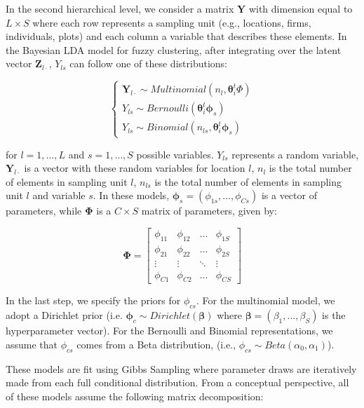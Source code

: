 \documentclass[article]{jss}
\begin{document}
In the second hierarchical level, we consider a matrix \(\mathbf{Y}\)
with dimension equal to \(L\times S\) where each row represents a
sampling unit (e.g., locations, firms, individuals, plots) and each
column a variable that describes these elements. In the Bayesian LDA
model for fuzzy clustering, after integrating over the latent vector
\(\mathbf{Z}_{l\cdot}\), \(Y_{ls}\) can follow one of these
distributions:

\begin{equation}
\begin{cases}
\mathbf{Y}_{l\cdot}\sim Multinomial(n_{l},\boldsymbol\theta_{i}^{t}\Phi)\\
Y_{ls}\sim Bernoulli(\boldsymbol\theta_{i}^{t}\boldsymbol\phi_{s})\\
Y_{ls}\sim Binomial(n_{ls},\boldsymbol\theta_{i}^{t}\boldsymbol\phi_{s})
        \label{eq:eq0003}
\end{cases}     
\end{equation}

\noindent for \(l=1,\dots,L\) and \(s=1,\dots,S\) possible variables.
\(Y_{ls}\) represents a random variable, \(\boldsymbol Y_{l\cdot}\) is a
vector with these random variables for location \(l\), \(n_{l}\) is the
total number of elements in sampling unit \(l\), \(n_{ls}\) is the total
number of elements in sampling unit \(l\) and variable \(s\). In these
models, \(\boldsymbol\phi_{s}=(\phi_{1s},\dots,\phi_{Cs})\) is a vector
of parameters, while \(\boldsymbol\Phi\) is a \(C\times S\) matrix of
parameters, given by:

\[
\mathbf{\Phi}=\begin{bmatrix}
    \phi_{11} & \phi_{12} & \dots  & \phi_{1S} \\
    \phi_{21} & \phi_{22} & \dots  & \phi_{2S} \\
    \vdots & \vdots  & \ddots & \vdots \\
    \phi_{C1} & \phi_{C2} & \dots  & \phi_{CS} 
\end{bmatrix}
\]

In the last step, we specify the priors for \(\phi_{cs}\). For the
multinomial model, we adopt a Dirichlet prior (i.e.
\(\boldsymbol\phi_{c}\sim Dirichlet(\boldsymbol\beta)\) where
\(\boldsymbol\beta=(\beta_{1},\dots,\beta_{S})\) is the hyperparameter
vector). For the Bernoulli and Binomial representations, we assume that
\(\phi_{cs}\) comes from a Beta distribution, (i.e.,
\(\phi_{cs}\sim Beta(\alpha_{0},\alpha_{1})\)).

These models are fit using Gibbs Sampling where parameter draws are
iteratively made from each full conditional distribution. From a
conceptual perspective, all of these models assume the following matrix
decomposition:
\end{document}
